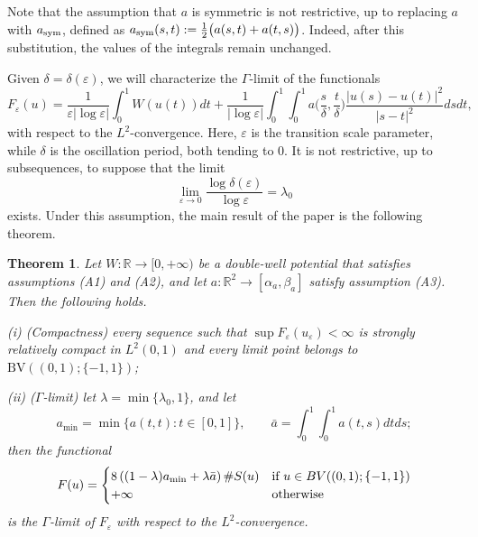\documentclass[12pt]{article}
\newtheorem{theorem}[definition]{Theorem}
\newcommand{\R}{\mathbb{R}}
\newcommand{\BV}{\mathrm{BV}}
\numberwithin{equation}{section}
\def\R{\mathbb R}
\begin{document}
    
    Note that the assumption that $a$ is symmetric is not restrictive, up to replacing $a$ with $a_{\rm sym}$, defined as
    $
    a_{\rm sym}(s,t):=\frac{1}{2}\big(a(s,t)+a(t,s)\big)
    $.
   Indeed, after this substitution, the values of the integrals remain unchanged.


Given $\delta=\delta(\varepsilon)$, we will characterize the $\Gamma$-limit of the functionals 
\begin{equation}\label{Functional}
F_\varepsilon(u)=    \frac{1}{\varepsilon|\log{\varepsilon}|}\int_{0}^{1}W(u(t))dt+\frac{1}{|\log\varepsilon|}\int_{0}^{1}\int_{0}^{1}a\Big(\frac{s}{\delta},\frac{t}{\delta}
    \Big)\frac{\left|u(s)-u(t)\right|^2}{\left|s-t\right|^2}dsdt,
\end{equation}
with respect to the $L^2$-convergence. Here, $\varepsilon$ is the transition scale parameter, while 
$\delta$ is the oscillation period, both tending to $0$. It is not restrictive, up to subsequences, to suppose that the limit
\[
\lim_{\varepsilon\to0}\frac{\log{\delta(\varepsilon)}}{\log{\varepsilon}}=\lambda_{0}
\]
exists. Under this assumption, the main result of the paper is the following theorem.

\begin{theorem}\label{main}
Let $W:\R\to[0,+\infty)$ be a double-well potential that satisfies assumptions {\rm (A1)} and {\rm (A2)}, and let $a:\R^2\to[\alpha_{a},\beta_{a}]$ satisfy assumption {\rm (A3)}. Then the following holds.

{\rm(i) (Compactness)} 
    every sequence such that $\sup F_{\varepsilon}(u_{\varepsilon})<\infty$ is strongly relatively compact in $L^2(0,1)$ and every limit point belongs to $\BV\left((0,1);\{-1,1\}\right)$;
    
{\rm(ii) ($\Gamma$-limit)} let $\lambda=\min\{\lambda_{0},1\}$, and let
$$
a_{\min}=\min\{a(t,t): t\in [0,1]\}, \qquad \bar{a}=\int_0^1\int_0^1 a(t,s)dtds;
$$
then the functional 
\begin{equation}\label{Gamma limit}
    F(u)= \begin{cases}
    8\left((1-\lambda)%
    a_{\min}+\lambda \bar{a}\right)\#S(u) & \hbox{if } u\in BV((0,1);\{-1,1\})\\ 
    +\infty& \hbox{otherwise}
    \end{cases}
\end{equation}
is the $\Gamma$-limit of $F_\varepsilon$ 
with respect to the 
$L^2$-convergence.
\end{theorem} 
\end{document}

